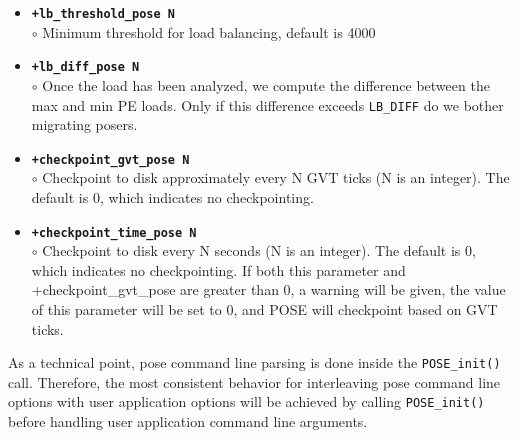 \begin{itemize}
\item {\tt {\bf +lb\_threshold\_pose N}}\\
	$\circ$ Minimum threshold for load balancing, default is 4000
\item {\tt {\bf +lb\_diff\_pose N}}\\
	$\circ$ Once the load has been analyzed, we compute the difference between the max and min PE loads.  Only if this difference exceeds {\tt LB\_DIFF} do we bother migrating posers.\\
\item {\tt {\bf +checkpoint\_gvt\_pose N}}\\
	$\circ$ Checkpoint to disk approximately every N GVT ticks (N is an integer).  The default is 0, which indicates no checkpointing.
\item {\tt {\bf +checkpoint\_time\_pose N}}\\
	$\circ$ Checkpoint to disk every N seconds (N is an integer).  The default is 0, which indicates no checkpointing.  If both this parameter and +checkpoint\_gvt\_pose are greater than 0, a warning will be given, the value of this parameter will be set to 0, and POSE will checkpoint based on GVT ticks.
\end{itemize}

As a technical point, pose command line parsing is done inside the
{\tt POSE\_init()} call.  Therefore, the most consistent behavior for
interleaving pose command line options with user application options
will be achieved by calling {\tt POSE\_init()} before handling user
application command line arguments.  
